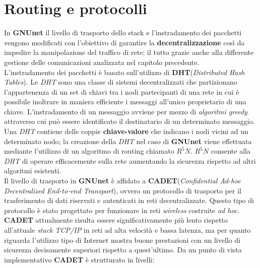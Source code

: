 \chapter{Routing e protocolli}
In \textbf{GNUnet} il livello di trasporto dello stack e l'instradamento dei pacchetti vengono modificati con l'obiettivo di garantire la \textbf{decentralizzazione} così da impedire la manipolazione del traffico di rete; il tutto grazie anche alla differente gestione delle comunicazioni analizzata nel capitolo precedente.\\
L'instradamento dei pacchetti è basato sull'utilizzo di \textbf{DHT}(\textit{Distributed Hash Tables}). Le \textit{DHT} sono una classe di sistemi decentralizzati che partizionano l'appartenenza di un set di chiavi tra i nodi partecipanti di una rete in cui è possibile inoltrare in maniera efficiente i messaggi all'unico proprietario di una chiave. L'instradamento di un messaggio avviene per mezzo di \textit{algoritmi greedy} attraverso cui può essere identificato il destinatario di un determinato messaggio.\\
Una \textit{DHT} contiene delle coppie \textbf{chiave-valore} che indicano i nodi vicini ad un determinato nodo; la creazione della \textit{DHT} nel caso di \textbf{GNUnet} viene effettuata mediante l'utilizzo di un algoritmo di routing chiamato $R^5N$\cite{R5N}. $R^5N$ consente alla \textit{DHT} di operare efficacemente sulla rete aumentando la sicurezza rispetto ad altri algoritmi esistenti.\\
Il livello di trasporto in \textbf{GNUnet} è affidato a \textbf{CADET}(\textit{Confidential Ad-hoc Decentralized End-to-end Transport}), ovvero un protocollo di trasporto per il trasferimento di dati riservati e autenticati in reti decentralizzate.\cite{cadet} Questo tipo di protocollo è stato progettato per funzionare in reti \textit{wireless} costruite \textit{ad hoc}. \textbf{CADET} attualmente risulta essere significativamente più lento rispetto all'attuale \textit{stack TCP/IP} in reti ad alta velocità e bassa latenza, ma per quanto riguarda l'utilizzo tipo di Internet mostra buone prestazioni con un livello di sicurezza decisamente superiori rispetto a quest'ultimo. Da un punto di vista implementativo \textbf{CADET} è strutturato in livelli:

